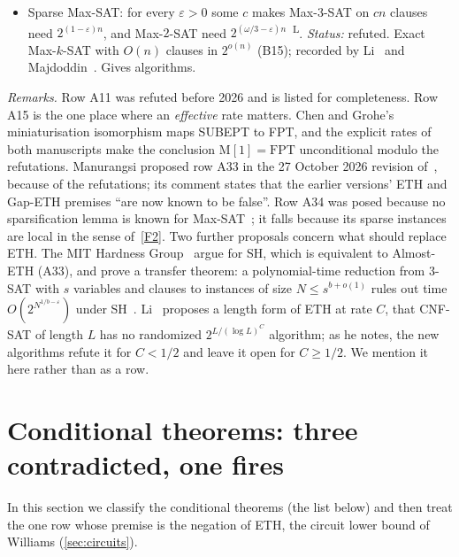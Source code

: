 \documentclass[10pt]{amsart}
\theoremstyle{plain}
\theoremstyle{definition}
\theoremstyle{remark}
\numberwithin{equation}{section}
\newcommand{\Lit}{\textsuperscript{L}}
\begin{document}
{\begin{itemize}[leftmargin=2.6em,itemsep=2pt]
\item[A34] Sparse Max-SAT: for every $\varepsilon>0$ some $c$ makes Max-$3$-SAT on $cn$ clauses need $2^{(1-\varepsilon)n}$, and Max-$2$-SAT need $2^{(\omega/3-\varepsilon)n}$~\cite[Hyp.~3,~4]{AVW20}\Lit. \emph{Status:} refuted. Exact Max-$k$-SAT with $O(n)$ clauses in $2^{o(n)}$ (B15); recorded by Li~\cite[Cor.~4.5]{Li26} and Majdoddin~\cite[\S3.8]{Maj26}. Gives algorithms.
\end{itemize}
}

\emph{Remarks.} Row A11 was refuted before 2026 and is listed for completeness. Row A15 is the one
place where an \emph{effective} rate matters. Chen and Grohe's miniaturisation isomorphism maps
SUBEPT to FPT, and the explicit rates of both manuscripts make the conclusion $\mathrm{M}[1]=\mathrm{FPT}$
unconditional modulo the refutations. Manurangsi proposed row A33 in the 27 October 2026
revision of~\cite{Man26}, because of the refutations; its comment states that the earlier
versions' ETH and Gap-ETH premises ``are now known to be false''. Row A34 was posed because no
sparsification lemma is known for Max-SAT~\cite{AVW20}; it falls because its sparse instances are
local in the sense of~\ref{F2}. Two further proposals concern what should replace ETH. The MIT
Hardness Group~\cite{MIT26} argue for SH, which is equivalent to Almost-ETH (A33), and prove a
transfer theorem: a polynomial-time reduction from $3$-SAT with $s$ variables and clauses to
instances of size $N\le s^{b+o(1)}$ rules out time $O(2^{N^{1/b-\varepsilon}})$ under
SH~\cite[Thm.~3.1]{MIT26}. Li~\cite[Hyp.~2.14]{Li26} proposes a length form of ETH at rate $C$, that
CNF-SAT of length $L$ has no randomized $2^{L/(\log L)^C}$ algorithm; as he notes, the new
algorithms refute it for $C<1/2$ and leave it open for $C\ge1/2$. We mention it here rather than
as a row.

\section{Conditional theorems: three contradicted, one fires}\label{sec:tableB}

In this section we classify the conditional theorems (the list below) and then treat the one row
whose premise is the negation of ETH, the circuit lower bound of Williams (\cref{sec:circuits}).
\end{document}
